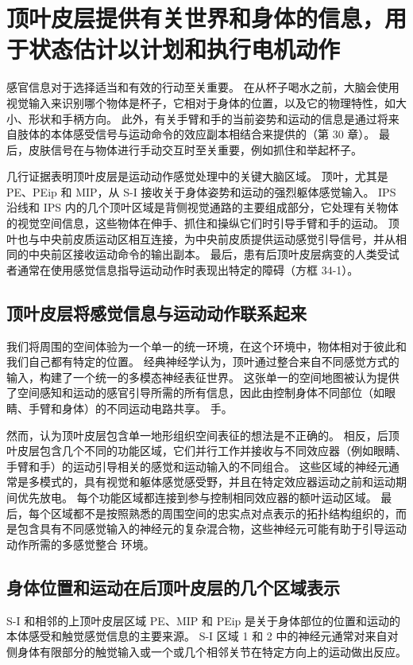 \section{顶叶皮层提供有关世界和身体的信息，用于状态估计以计划和执行电机动作}
感官信息对于选择适当和有效的行动至关重要。 在从杯子喝水之前，大脑会使用视觉输入来识别哪个物体是杯子，它相对于身体的位置，以及它的物理特性，如大小、形状和手柄方向。 此外，有关手臂和手的当前姿势和运动的信息是通过将来自肢体的本体感受信号与运动命令的效应副本相结合来提供的（第 30 章）。 最后，皮肤信号在与物体进行手动交互时至关重要，例如抓住和举起杯子。

几行证据表明顶叶皮层是运动动作感觉处理中的关键大脑区域。 顶叶，尤其是 PE、PEip 和 MIP，从 S-I 接收关于身体姿势和运动的强烈躯体感觉输入。 IPS 沿线和 IPS 内的几个顶叶区域是背侧视觉通路的主要组成部分，它处理有关物体的视觉空间信息，这些物体在伸手、抓住和操纵它们时引导手臂和手的运动。 顶叶也与中央前皮质运动区相互连接，为中央前皮质提供运动感觉引导信号，并从相同的中央前区接收运动命令的输出副本。 最后，患有后顶叶皮层病变的人类受试者通常在使用感觉信息指导运动动作时表现出特定的障碍（方框 34-1）。


\subsection{顶叶皮层将感觉信息与运动动作联系起来}
我们将周围的空间体验为一个单一的统一环境，在这个环境中，物体相对于彼此和我们自己都有特定的位置。 经典神经学认为，顶叶通过整合来自不同感觉方式的输入，构建了一个统一的多模态神经表征世界。 这张单一的空间地图被认为提供了空间感知和运动的感官引导所需的所有信息，因此由控制身体不同部位（如眼睛、手臂和身体）的不同运动电路共享。 手。

然而，认为顶叶皮层包含单一地形组织空间表征的想法是不正确的。 相反，后顶叶皮层包含几个不同的功能区域，它们并行工作并接收与不同效应器（例如眼睛、手臂和手）的运动引导相关的感觉和运动输入的不同组合。 这些区域的神经元通常是多模式的，具有视觉和躯体感觉感受野，并且在特定效应器运动之前和运动期间优先放电。 每个功能区域都连接到参与控制相同效应器的额叶运动区域。 最后，每个区域都不是按照熟悉的周围空间的忠实点对点表示的拓扑结构组织的，而是包含具有不同感觉输入的神经元的复杂混合物，这些神经元可能有助于引导运动动作所需的多感觉整合 环境。



\subsection{身体位置和运动在后顶叶皮层的几个区域表示}
S-I 和相邻的上顶叶皮层区域 PE、MIP 和 PEip 是关于身体部位的位置和运动的本体感受和触觉感觉信息的主要来源。 S-I 区域 1 和 2 中的神经元通常对来自对侧身体有限部分的触觉输入或一个或几个相邻关节在特定方向上的运动做出反应。

